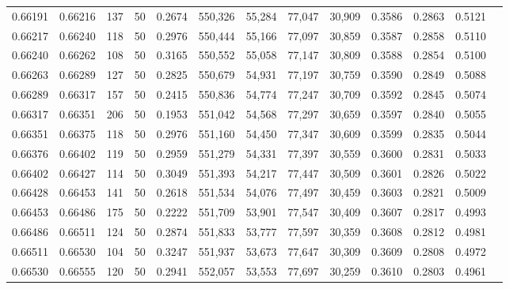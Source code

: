 \begin{tabular}{rrrrrrrrrrrrr}
0.66191 & 0.66216 &   137 &  50 &                                     0.2674 & 550,326 &  55,284 &  77,047 &  30,909 & 0.3586 & 0.2863 & 0.5121 \\
0.66217 & 0.66240 &   118 &  50 &                                     0.2976 & 550,444 &  55,166 &  77,097 &  30,859 & 0.3587 & 0.2858 & 0.5110 \\
0.66240 & 0.66262 &   108 &  50 &                                     0.3165 & 550,552 &  55,058 &  77,147 &  30,809 & 0.3588 & 0.2854 & 0.5100 \\
0.66263 & 0.66289 &   127 &  50 &                                     0.2825 & 550,679 &  54,931 &  77,197 &  30,759 & 0.3590 & 0.2849 & 0.5088 \\
0.66289 & 0.66317 &   157 &  50 &                                     0.2415 & 550,836 &  54,774 &  77,247 &  30,709 & 0.3592 & 0.2845 & 0.5074 \\
0.66317 & 0.66351 &   206 &  50 &                                     0.1953 & 551,042 &  54,568 &  77,297 &  30,659 & 0.3597 & 0.2840 & 0.5055 \\
0.66351 & 0.66375 &   118 &  50 &                                     0.2976 & 551,160 &  54,450 &  77,347 &  30,609 & 0.3599 & 0.2835 & 0.5044 \\
0.66376 & 0.66402 &   119 &  50 &                                     0.2959 & 551,279 &  54,331 &  77,397 &  30,559 & 0.3600 & 0.2831 & 0.5033 \\
0.66402 & 0.66427 &   114 &  50 &                                     0.3049 & 551,393 &  54,217 &  77,447 &  30,509 & 0.3601 & 0.2826 & 0.5022 \\
0.66428 & 0.66453 &   141 &  50 &                                     0.2618 & 551,534 &  54,076 &  77,497 &  30,459 & 0.3603 & 0.2821 & 0.5009 \\
0.66453 & 0.66486 &   175 &  50 &                                     0.2222 & 551,709 &  53,901 &  77,547 &  30,409 & 0.3607 & 0.2817 & 0.4993 \\
0.66486 & 0.66511 &   124 &  50 &                                     0.2874 & 551,833 &  53,777 &  77,597 &  30,359 & 0.3608 & 0.2812 & 0.4981 \\
0.66511 & 0.66530 &   104 &  50 &                                     0.3247 & 551,937 &  53,673 &  77,647 &  30,309 & 0.3609 & 0.2808 & 0.4972 \\
0.66530 & 0.66555 &   120 &  50 &                                     0.2941 & 552,057 &  53,553 &  77,697 &  30,259 & 0.3610 & 0.2803 & 0.4961 \\

\end{tabular}
